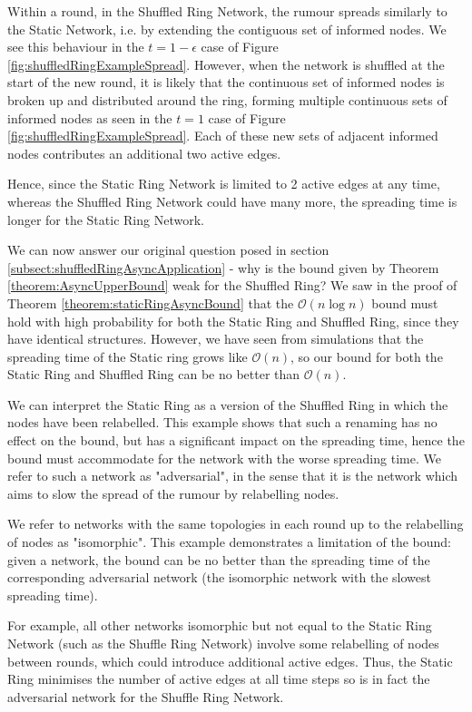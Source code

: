 Within a round, in the Shuffled Ring Network, the rumour spreads similarly to the Static Network, i.e. by extending the contiguous set of informed nodes. We see this behaviour in the $t = 1 - \epsilon$ case of Figure \ref{fig:shuffledRingExampleSpread}. However, when the network is shuffled at the start of the new round, it is likely that the continuous set of informed nodes is broken up and distributed around the ring, forming multiple continuous sets of informed nodes as seen in the $t=1$ case of Figure \ref{fig:shuffledRingExampleSpread}. Each of these new sets of adjacent informed nodes contributes an additional two active edges.

Hence, since the Static Ring Network is limited to 2 active edges at any time, whereas the Shuffled Ring Network could have many more, the spreading time is longer for the Static Ring Network.


We can now answer our original question posed in section \ref{subsect:shuffledRingAsyncApplication} - why is the bound given by Theorem \ref{theorem:AsyncUpperBound} weak for the Shuffled Ring? We saw in the proof of Theorem \ref{theorem:staticRingAsyncBound} that the $\mathcal{O}(n \log n)$ bound must hold with high probability for both the Static Ring and Shuffled Ring, since they have identical structures. However, we have seen from simulations that the spreading time of the Static ring grows like $\mathcal{O}(n)$, so our bound for both the Static Ring and Shuffled Ring can be no better than $\mathcal{O}(n)$. 

We can interpret the Static Ring as a version of the Shuffled Ring in which the nodes have been relabelled. This example shows that such a renaming has no effect on the bound, but has a significant impact on the spreading time, hence the bound must accommodate for the network with the worse spreading time. We refer to such a network as "adversarial", in the sense that it is the network which aims to slow the spread of the rumour by relabelling nodes.

We refer to networks with the same topologies in each round up to the relabelling of nodes as "isomorphic". This example demonstrates a limitation of the bound: given a network, the bound can be no better than the spreading time of the corresponding adversarial network (the isomorphic network with the slowest spreading time).

For example, all other networks isomorphic but not equal to the Static Ring Network (such as the Shuffle Ring Network) involve some relabelling of nodes between rounds, which could introduce additional active edges. Thus, the Static Ring minimises the number of active edges at all time steps so is in fact the adversarial network for the Shuffle Ring Network. 

